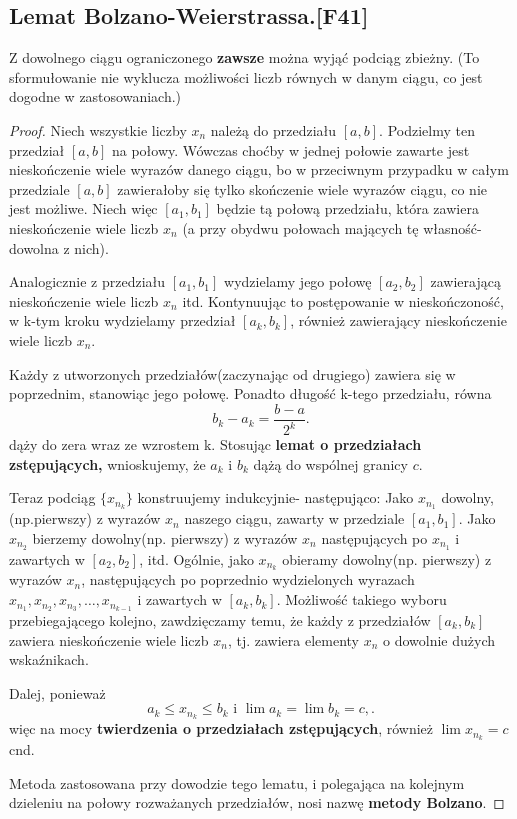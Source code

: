 \subsection{Lemat Bolzano-Weierstrassa.[F41]}

\begin{lemma}
	Z dowolnego ciągu ograniczonego \textbf{zawsze} można wyjąć podciąg zbieżny. (To sformułowanie  nie wyklucza możliwości liczb równych w danym ciągu, co jest dogodne w zastosowaniach.)
\end{lemma}  
\begin{proof}
	Niech wszystkie liczby $x_{n}$ należą do przedziału $[a,b]$. Podzielmy ten przedział  $[a,b]$ na połowy. Wówczas choćby w jednej połowie zawarte jest nieskończenie wiele wyrazów danego ciągu, bo w przeciwnym przypadku w całym przedziale $[a,b]$ zawierałoby się tylko skończenie wiele wyrazów ciągu, co nie jest możliwe. Niech więc $[a_1,b_1]$ będzie tą połową przedziału, która zawiera nieskończenie wiele liczb $x_{n}$ (a przy obydwu połowach mających tę własność- dowolna z nich).

	Analogicznie z przedziału $[a_1,b_1]$ wydzielamy jego połowę $[a_2,b_2]$ zawierającą nieskończenie wiele liczb $x_{n}$ itd. Kontynuując to postępowanie w nieskończoność, w k-tym kroku wydzielamy przedział $[a_{k}, b_{k}]$, również zawierający nieskończenie wiele liczb  $x_{n}$.

	Każdy z utworzonych przedziałów(zaczynając od drugiego) zawiera się w poprzednim, stanowiąc jego połowę. Ponadto długość k-tego przedziału, równa 
	\[
		b_{k}-a_{k} = \frac{b-a}{2^{k}}
	.\] 
	dąży do zera wraz ze wzrostem k. Stosując \textbf{lemat o przedziałach zstępujących,} wnioskujemy, że $a_{k}$ i $b_{k}$ dążą do wspólnej granicy $c$.

	Teraz podciąg $\{x_{n_{k}}\} $ konstruujemy indukcyjnie- następująco: Jako $x_{n_1}$ dowolny, (np.pierwszy) z wyrazów $x_{n}$ naszego ciągu, zawarty w przedziale $[a_1, b_1]$. Jako $x_{n_2}$ bierzemy dowolny(np. pierwszy) z wyrazów $x_{n}$ następujących po $x_{n_1}$ i zawartych w $[a_2,b_2]$, itd. Ogólnie, jako $x_{n_{k}}$ obieramy dowolny(np. pierwszy) z wyrazów $x_{n}$, następujących po poprzednio wydzielonych wyrazach $x_{n_1}, x_{n_2}, x_{n_3},\ldots, x_{n_{k-1}}$ i zawartych w $[a_{k}, b_{k}]$. Możliwość takiego wyboru przebiegającego kolejno, zawdzięczamy temu, że każdy z przedziałów $[a_{k}, b_{k}]$ zawiera nieskończenie wiele liczb $x_{n}$, tj. zawiera elementy  $x_{n}$ o dowolnie dużych wskaźnikach.

	Dalej, ponieważ
	\[
	a_{k}\le  x_{n_{k}}\le b_{k}\text{ i } \lim a_{k}= \lim b_{k} = c,
	.\] 
	więc na mocy \textbf{twierdzenia o przedziałach zstępujących}, również $\lim x_{n_{k}} = c$ cnd.

	Metoda zastosowana przy dowodzie tego lematu, i polegająca na kolejnym dzieleniu na połowy rozważanych przedziałów, nosi nazwę \textbf{metody Bolzano}. 
\end{proof} 




